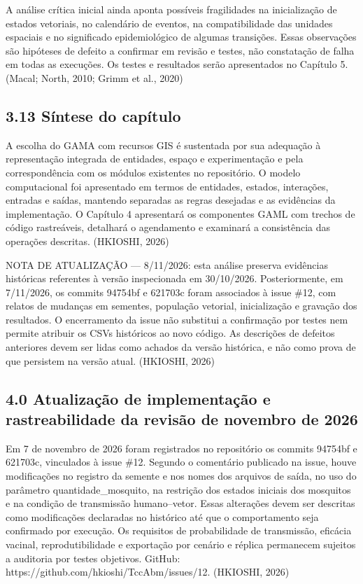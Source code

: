 A análise crítica inicial ainda aponta possíveis fragilidades na
inicialização de estados vetoriais, no calendário de eventos, na
compatibilidade das unidades espaciais e no significado epidemiológico
de algumas transições. Essas observações são hipóteses de defeito a
confirmar em revisão e testes, não constatação de falha em todas as
execuções. Os testes e resultados serão apresentados no Capítulo 5.
(Macal; North, 2010; Grimm et al., 2020)

\subsection{3.13 Síntese do capítulo}\label{suxedntese-do-capuxedtulo-1}

A escolha do GAMA com recursos GIS é sustentada por sua adequação à
representação integrada de entidades, espaço e experimentação e pela
correspondência com os módulos existentes no repositório. O modelo
computacional foi apresentado em termos de entidades, estados,
interações, entradas e saídas, mantendo separadas as regras desejadas e
as evidências da implementação. O Capítulo 4 apresentará os componentes
GAML com trechos de código rastreáveis, detalhará o agendamento e
examinará a consistência das operações descritas. (HKIOSHI, 2026)

NOTA DE ATUALIZAÇÃO --- 8/11/2026: esta análise preserva evidências
históricas referentes à versão inspecionada em 30/10/2026.
Posteriormente, em 7/11/2026, os commits 94754bf e 621703c foram
associados à issue \#12, com relatos de mudanças em sementes, população
vetorial, inicialização e gravação dos resultados. O encerramento da
issue não substitui a confirmação por testes nem permite atribuir os
CSVs históricos ao novo código. As descrições de defeitos anteriores
devem ser lidas como achados da versão histórica, e não como prova de
que persistem na versão atual. (HKIOSHI, 2026)

\subsection{4.0 Atualização de implementação e rastreabilidade da
revisão de novembro de
2026}\label{atualizauxe7uxe3o-de-implementauxe7uxe3o-e-rastreabilidade-da-revisuxe3o-de-novembro-de-2026}

Em 7 de novembro de 2026 foram registrados no repositório os commits
94754bf e 621703c, vinculados à issue \#12. Segundo o comentário
publicado na issue, houve modificações no registro da semente e nos
nomes dos arquivos de saída, no uso do parâmetro quantidade\_mosquito,
na restrição dos estados iniciais dos mosquitos e na condição de
transmissão humano--vetor. Essas alterações devem ser descritas como
modificações declaradas no histórico até que o comportamento seja
confirmado por execução. Os requisitos de probabilidade de transmissão,
eficácia vacinal, reprodutibilidade e exportação por cenário e réplica
permanecem sujeitos a auditoria por testes objetivos. GitHub:
https://github.com/hkioshi/TccAbm/issues/12. (HKIOSHI, 2026)

